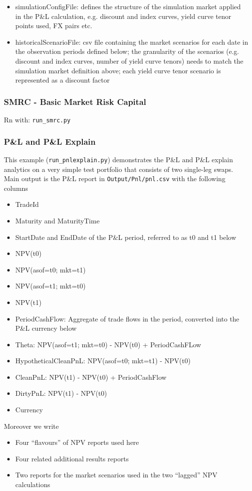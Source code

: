 \begin{itemize}
\item simulationConfigFile: defines the structure of the simulation market applied in the P\&L calculation, e.g. discount and index curves, yield curve tenor points used, FX pairs etc.
\item historicalScenarioFile: csv file containing the market scenarios for each date in the observation periods defined below; the granularity of the scenarios (e.g. discount and index curves, number of yield curve tenors) needs to match the simulation market definition above; each yield curve tenor scenario is represented as a discount factor
\end{itemize}

\subsubsection{SMRC - Basic Market Risk Capital}

Rn with: {\tt run\_smrc.py}

\subsubsection{P\&L and P\&L Explain}
\label{example:marketrisk_pnl}

This example ({\tt run\_pnlexplain.py}) demonstrates the P\&L and P\&L explain analytics
on a very simple test portfolio that consists of two
single-leg swaps.
Main output is the P\&L report in {\tt Output/Pnl/pnl.csv} with the following columns
\begin{itemize}
\item TradeId
\item Maturity and MaturityTime
\item StartDate and EndDate of the P\&L period, referred to as t0 and t1 below
\item NPV(t0)
\item NPV(asof=t0; mkt=t1)
\item NPV(asof=t1; mkt=t0)
\item NPV(t1)
\item PeriodCashFlow: Aggregate of trade flows in the period, converted into the P\&L currency below
\item Theta: NPV(asof=t1; mkt=t0) - NPV(t0) + PeriodCashFLow
\item HypotheticalCleanPnL: NPV(asof=t0; mkt=t1) - NPV(t0)
\item CleanPnL: NPV(t1) - NPV(t0) + PeriodCashFlow
\item DirtyPnL: NPV(t1) - NPV(t0)
\item Currency
\end{itemize}
Moreover we write
\begin{itemize}
\item Four ``flavours'' of NPV reports used here
\item Four related additional results reports
\item Two reports for the market scenarios used in the two ``lagged'' NPV calculations
\end{itemize}

